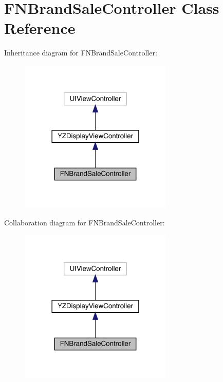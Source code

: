 \hypertarget{interface_f_n_brand_sale_controller}{}\section{F\+N\+Brand\+Sale\+Controller Class Reference}
\label{interface_f_n_brand_sale_controller}


Inheritance diagram for F\+N\+Brand\+Sale\+Controller\+:\nopagebreak
\begin{figure}[H]
\begin{center}
\leavevmode
\includegraphics[width=206pt]{interface_f_n_brand_sale_controller__inherit__graph}
\end{center}
\end{figure}


Collaboration diagram for F\+N\+Brand\+Sale\+Controller\+:\nopagebreak
\begin{figure}[H]
\begin{center}
\leavevmode
\includegraphics[width=206pt]{interface_f_n_brand_sale_controller__coll__graph}
\end{center}
\end{figure}
